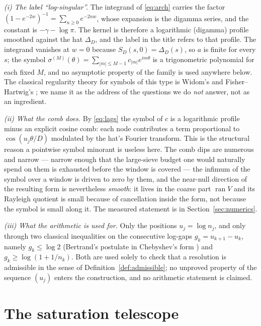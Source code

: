 \documentclass[11pt,a4paper]{article}
\theoremstyle{plain}
\theoremstyle{definition}
\newcommand{\ran}{\operatorname{ran}}
\begin{document}
\emph{(i) The label ``log-singular''.} The integrand of \eqref{eq:arch} carries the
factor $(1-e^{-2w})^{-1}=\sum_{n\ge0}e^{-2nw}$, whose expansion is the digamma
series, and the constant is $-\gamma-\log\pi$. The kernel is therefore a
logarithmic (digamma) profile smoothed against the hat $\Delta_{D}$, and the label
in the title refers to that profile. The integrand vanishes at $w=0$ because
$S_{D}(s,0)=\Delta_{D}(s)$, so $a$ is finite for every $s$; the symbol
$\sigma^{(M)}(\theta)=\sum_{|m|\le M-1}c_{|m|}e^{im\theta}$ is a trigonometric
polynomial for each fixed $M$, and no asymptotic property of the family is used
anywhere below. The classical regularity theory for symbols of this type is Widom's
and Fisher--Hartwig's \cite{Widom1974,FisherHartwig1969,BoettcherSilbermann2006}; we
name it as the address of the questions we do \emph{not} answer, not as an ingredient.

\emph{(ii) What the comb does.} By \eqref{eq:lags} the symbol of $c$ is a logarithmic
profile minus an explicit cosine comb: each node contributes a term proportional to
$\cos(u_{j}\theta/D)$ modulated by the hat's Fourier transform. This is the structural
reason a pointwise symbol minorant is useless here. The comb dips are numerous and
narrow --- narrow enough that the large-sieve budget one would naturally spend on them
\cite{MontgomeryVaughan1974} is exhausted before the window is covered --- the
infimum of the symbol over a window is driven to zero by them, and the
near-null direction of the resulting form is nevertheless \emph{smooth}: it lives in
the coarse part $\ran V$ and its Rayleigh quotient is small because of cancellation
inside the form, not because the symbol is small along it. The measured statement is
in Section~\ref{sec:numerics}.

\emph{(iii) What the arithmetic is used for.} Only the positions $u_{j}=\log n_{j}$,
and only through two classical inequalities on the consecutive log-gaps
$g_{k}=u_{k+1}-u_{k}$, namely $g_{k}\le\log 2$ (Bertrand's postulate in Chebyshev's
form \cite{Chebyshev1852}) and $g_{k}\ge\log(1+1/n_{k})$. Both are used solely to
check that a resolution is admissible in the sense of
Definition~\ref{def:admissible}; no unproved property of the sequence
$(u_{j})$ enters the construction, and no arithmetic statement is claimed.

\section{The saturation telescope}
\label{sec:telescope}
\end{document}
